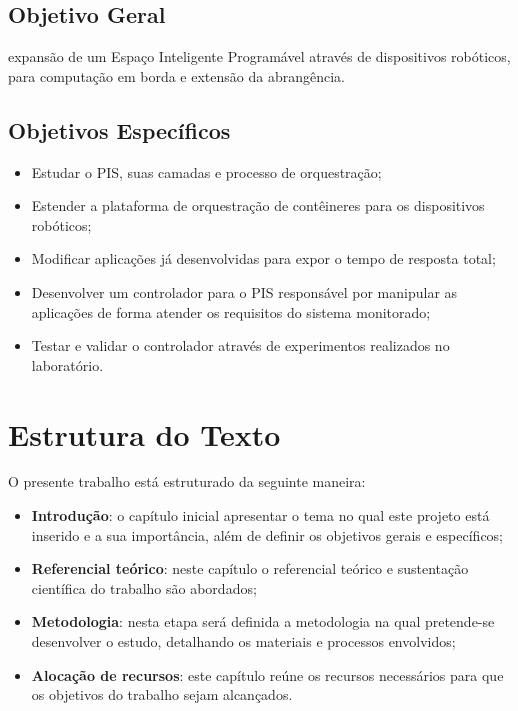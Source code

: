 \subsection{Objetivo Geral}


{}  expansão de um Espaço Inteligente Programável através de dispositivos robóticos, para computação em borda e extensão da  abrangência. 


\subsection{Objetivos Específicos}

\begin{itemize}

\item Estudar o PIS, suas camadas e processo de orquestração;
\item Estender a plataforma de orquestração de contêineres para os dispositivos robóticos;
\item Modificar aplicações já desenvolvidas para expor o tempo de resposta total;
\item Desenvolver um controlador para o PIS responsável por manipular as aplicações de forma atender os requisitos do sistema monitorado;
\item Testar e validar o controlador através de experimentos realizados no laboratório.

\end{itemize}

\section{Estrutura do Texto}
O presente trabalho está estruturado da seguinte maneira:
\begin{itemize}
\item
\textbf{Introdução}: o capítulo inicial  apresentar o tema no qual este projeto está inserido e a sua importância, além de definir os objetivos gerais e específicos;
\item \textbf{Referencial teórico}: neste capítulo o referencial teórico e sustentação científica do trabalho são abordados; 
\item \textbf{Metodologia}: nesta etapa será definida a metodologia na qual pretende-se desenvolver o estudo, detalhando os materiais e processos envolvidos; 
\item \textbf{Alocação de recursos}: este capítulo reúne os recursos necessários para que os objetivos do trabalho sejam alcançados.
\end{itemize}